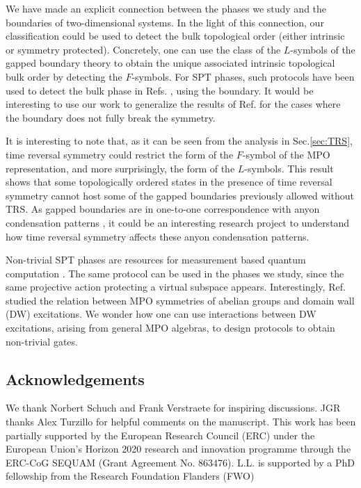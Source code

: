 \documentclass[a4paper,twocolumn,11pt,accepted=2023-02-10]{quantumarticle}
\begin{document}
We have made an explicit connection between the phases we study and the boundaries of two-dimensional systems. In the light of this connection, our classification could be used to detect the bulk topological order (either intrinsic or symmetry protected). Concretely, one can use the class of the ${L}$-symbols of the gapped boundary theory to obtain the unique associated intrinsic topological bulk order \cite{Kong17} by detecting the $F$-symbols. For SPT phases, such protocols have been used to detect the bulk phase in Refs. \cite{Chen11A,Else14,Zaletel14,Kawagoe21}, using the boundary. It would be interesting to use our work to generalize the results of Ref. \cite{Kawagoe21} for the cases where the boundary does not fully break the symmetry.


It is interesting to note that, as it can be seen from the analysis in Sec.\ref{sec:TRS}, time reversal symmetry could restrict the form of the ${F}$-symbol of the MPO representation, and more surprisingly, the form of the ${L}$-symbols. This result shows that some topologically ordered states in the presence of time reversal symmetry cannot host some of the gapped boundaries previously allowed without TRS. As gapped boundaries are in one-to-one correspondence with anyon condensation patterns \cite{Kitaev12}, it could be an interesting research project to understand how time reversal symmetry affects these anyon condensation patterns.

Non-trivial SPT phases are resources for measurement based quantum computation \cite{Else12}. The same protocol can be used in the phases we study, since the same projective action protecting a virtual subspace appears. Interestingly, Ref.\ \cite{Wang15A} studied the relation between MPO symmetries of abelian groups and domain wall (DW) excitations. We wonder how one can use interactions between DW excitations, arising from general MPO algebras, to design protocols to obtain non-trivial gates. 


\subsection*{Acknowledgements}
We thank Norbert Schuch and Frank Verstraete for inspiring  discussions. JGR thanks Alex Turzillo for helpful comments on the manuscript. This work has been partially supported by the European Research Council (ERC) under the European Union’s Horizon 2020 research and innovation programme through the ERC-CoG SEQUAM (Grant Agreement No. 863476). L.L. is supported by a PhD fellowship from the Research Foundation Flanders (FWO)
\end{document}
